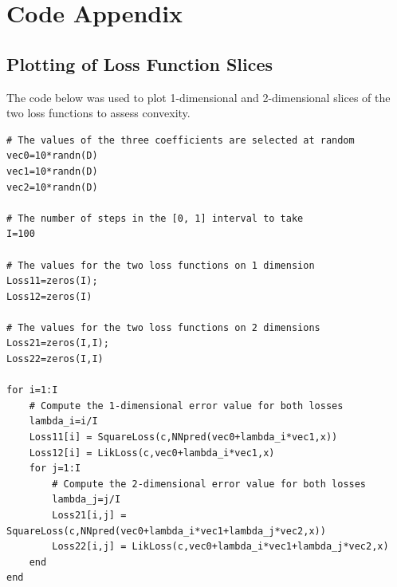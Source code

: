 \documentclass[fleqn]{article}
\begin{document}
\section*{Code Appendix}

\subsection*{Plotting of Loss Function Slices}
The code below was used to plot 1-dimensional and 2-dimensional slices of the two loss functions to assess convexity.
\begin{verbatim}
# The values of the three coefficients are selected at random
vec0=10*randn(D)
vec1=10*randn(D)
vec2=10*randn(D)

# The number of steps in the [0, 1] interval to take
I=100

# The values for the two loss functions on 1 dimension
Loss11=zeros(I);
Loss12=zeros(I)

# The values for the two loss functions on 2 dimensions
Loss21=zeros(I,I);
Loss22=zeros(I,I)

for i=1:I
    # Compute the 1-dimensional error value for both losses
    lambda_i=i/I
    Loss11[i] = SquareLoss(c,NNpred(vec0+lambda_i*vec1,x))
    Loss12[i] = LikLoss(c,vec0+lambda_i*vec1,x)
    for j=1:I
        # Compute the 2-dimensional error value for both losses
        lambda_j=j/I
        Loss21[i,j] = SquareLoss(c,NNpred(vec0+lambda_i*vec1+lambda_j*vec2,x))
        Loss22[i,j] = LikLoss(c,vec0+lambda_i*vec1+lambda_j*vec2,x)
    end
end
\end{verbatim}
\end{document}
